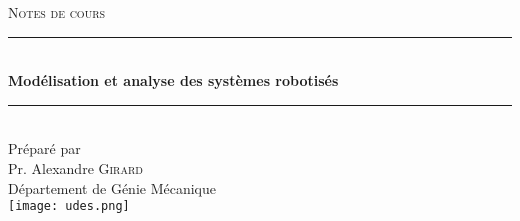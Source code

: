 ﻿%

\begin{titlepage}

\center 
 


\textsc{\LARGE 
Notes de cours
}\\[1.5cm] 

\rule{\linewidth}{0.5mm} \\[0.4cm]
{\huge \bfseries 
Modélisation et analyse des systèmes robotisés
}\\[0.4cm] 
\rule{\linewidth}{0.5mm} \\[1.5cm]
 
{\large Préparé par}\\[1cm]
{\LARGE Pr. Alexandre \textsc{Girard} }\\[1cm] 
{\LARGE Département de Génie Mécanique }\\[2cm]

\texttt{[image: udes.png]}\\[1cm] 

\vfill 

\end{titlepage}
\restoregeometry